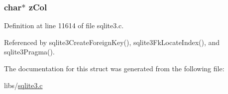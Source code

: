 \subsubsection[{z\+Col}]{\setlength{\rightskip}{0pt plus 5cm}char$\ast$ z\+Col}\label{struct_f_key_1_1s_col_map_a7df4bd4e0f5bc6b14b662863df03b0f6}


Definition at line 11614 of file sqlite3.\+c.



Referenced by sqlite3\+Create\+Foreign\+Key(), sqlite3\+Fk\+Locate\+Index(), and sqlite3\+Pragma().



The documentation for this struct was generated from the following file\+:\begin{DoxyCompactItemize}
\item 
libs/\hyperlink{sqlite3_8c}{sqlite3.\+c}\end{DoxyCompactItemize}
